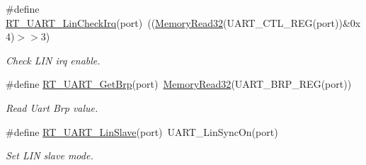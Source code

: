 \begin{DoxyCompactItemize}
\#define \mbox{\hyperlink{a00098_a2e2715198f9716282584f34a7f472649}{R\+T\+\_\+\+U\+A\+R\+T\+\_\+\+Lin\+Check\+Irq}}(port)~((\mbox{\hyperlink{a00026_a2d484dc15bdf30ee11ab3b05f31f0e16}{Memory\+Read32}}(U\+A\+R\+T\+\_\+\+C\+T\+L\+\_\+\+R\+EG(port))\&0x4)$>$$>$3)
\begin{DoxyCompactList}\small\item\em Check L\+IN irq enable. \end{DoxyCompactList}\item 
\#define \mbox{\hyperlink{a00098_a74f1bca1f0b60eeec1f84bcba3e34919}{R\+T\+\_\+\+U\+A\+R\+T\+\_\+\+Get\+Brp}}(port)~\mbox{\hyperlink{a00026_a2d484dc15bdf30ee11ab3b05f31f0e16}{Memory\+Read32}}(U\+A\+R\+T\+\_\+\+B\+R\+P\+\_\+\+R\+EG(port))
\begin{DoxyCompactList}\small\item\em Read Uart Brp value. \end{DoxyCompactList}\item 
\#define \mbox{\hyperlink{a00098_a3f9518fa74ec401803fe1d15e0d39ff2}{R\+T\+\_\+\+U\+A\+R\+T\+\_\+\+Lin\+Slave}}(port)~U\+A\+R\+T\+\_\+\+Lin\+Sync\+On(port)
\begin{DoxyCompactList}\small\item\em Set L\+IN slave mode. \end{DoxyCompactList}\end{DoxyCompactItemize}
